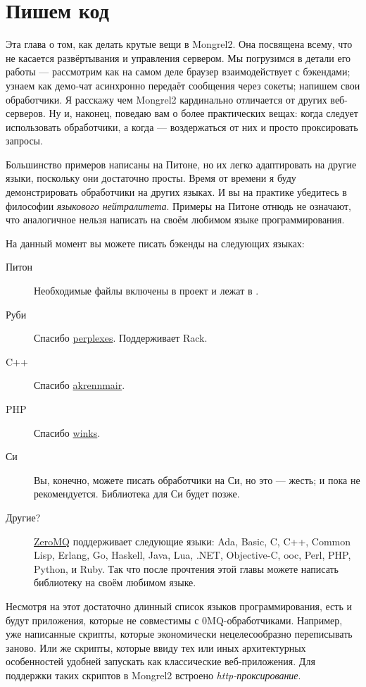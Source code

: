 \chapter{Пишем код}

Эта глава о том, как делать крутые вещи в Mongrel2. Она посвящена всему, что не
касается развёртывания и управления сервером. Мы погрузимся в детали его работы
--- рассмотрим как на самом деле браузер взаимодействует с бэкендами; узнаем как
демо-чат асинхронно передаёт сообщения через сокеты; напишем свои обработчики. Я
расскажу чем Mongrel2 кардинально отличается от других веб-серверов.  Ну и,
наконец, поведаю вам о более практических вещах: когда следует использовать
обработчики, а когда --- воздержаться от них и просто проксировать запросы.

Большинство примеров написаны на Питоне, но их легко адаптировать на другие
языки, поскольку они достаточно просты. Время от времени я буду демонстрировать
обработчики на других языках. И вы на практике убедитесь в философии
\emph{языкового нейтралитета}. Примеры на Питоне отнюдь не означают, что
аналогичное нельзя написать на своём любимом языке программирования.

На данный момент вы можете писать бэкенды на следующих языках:

\begin{description}
\item [Питон] Необходимые файлы включены в проект и лежат в .
\item [Руби] Спасибо \href{http://github.com/perplexes/m2r}{perplexes}. Поддерживает Rack.
\item [C++] Спасибо \href{http://github.com/akrennmair/mongrel2-cpp}{akrennmair}.
\item [PHP] Спасибо \href{http://github.com/winks/m2php}{winks}.
\item[Си] Вы, конечно, можете писать обработчики на Си, но это --- жесть; и
пока не рекомендуется. Библиотека для Си будет позже.
\item[Другие?] \href{http://zeromq.org}{ZeroMQ} поддерживает следующие языки:
Ada, Basic, C, C++, Common Lisp, Erlang, Go, Haskell, Java, Lua, .NET,
Objective-C, ooc, Perl, PHP, Python, и Ruby. Так что после прочтения этой главы
можете написать библиотеку на своём любимом языке.
\end{description}

Несмотря на этот достаточно длинный список языков программирования, есть и будут
приложения, которые не совместимы с 0MQ-обработчиками. Например, уже написанные
скрипты, которые экономически нецелесообразно переписывать заново. Или же
скрипты, которые ввиду тех или иных архитектурных особенностей удобней запускать
как классические веб-приложения. Для поддержки таких скриптов в Mongrel2
встроено \emph{http-проксирование}. 

